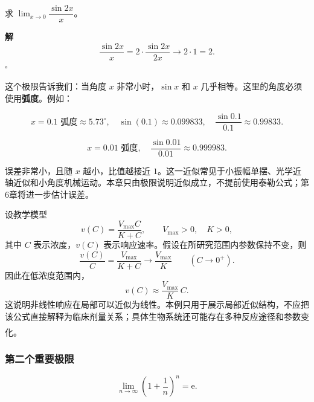 \documentclass[fontset=fandol]{ctexart}
\newenvironment{solution}{\par\noindent\textbf{解}\quad}{\hfill$\square$\par\vspace{0.8em}}
\newcommand{\ee}{\mathrm{e}}
\newcommand{\upcite}[1]{\textsuperscript{\textsuperscript{\cite{#1}}}}
\begin{document}
\begin{example}
	求 \(\lim_{x \to 0} \dfrac{\sin 2x}{x}\)。
\end{example}

\begin{solution}
	\[
	\dfrac{\sin 2x}{x} = 2 \cdot \dfrac{\sin 2x}{2x} \to 2 \cdot 1 = 2.
	\]
\end{solution}


\begin{application}[物理：小角度近似]

这个极限告诉我们：当角度 \(x\) 非常小时，\(\sin x\) 和 \(x\) 几乎相等。这里的角度必须使用\textbf{弧度}。例如：

\[
x = 0.1 \text{ 弧度} \approx 5.73^\circ,\quad \sin(0.1) \approx 0.099833,\quad \dfrac{\sin 0.1}{0.1} \approx 0.99833.
\]

\[
x = 0.01 \text{ 弧度},\quad \dfrac{\sin 0.01}{0.01} \approx 0.999983.
\]

误差非常小，且随 \(x\) 越小，比值越接近 $1$。这一近似常见于小振幅单摆、光学近轴近似和小角度机械运动。本章只由极限说明近似成立，不提前使用泰勒公式；第6章将进一步估计误差。

\end{application}

\begin{application}
设教学模型
\[
v(C)=\frac{V_{\max}C}{K+C},\qquad V_{\max}>0,\quad K>0,
\]
其中 $C$ 表示浓度，$v(C)$ 表示响应速率。假设在所研究范围内参数保持不变，则
\[
\frac{v(C)}{C}=\frac{V_{\max}}{K+C}
\longrightarrow\frac{V_{\max}}K
\qquad(C\to0^+).
\]
因此在低浓度范围内，
\[
v(C)\approx\frac{V_{\max}}K\,C.
\]
这说明非线性响应在局部可以近似为线性。本例只用于展示局部近似结构，不应把该公式直接解释为临床剂量关系；具体生物系统还可能存在多种反应途径和参数变化。\upcite{NCBIEnzyme}
\end{application}

\subsubsection*{第二个重要极限}


\begin{theorem}[自然常数 e ]
	\[
	\lim_{n\to\infty} \left(1 + \dfrac{1}{n}\right)^n = \ee.
	\]
\end{theorem}
\end{document}
